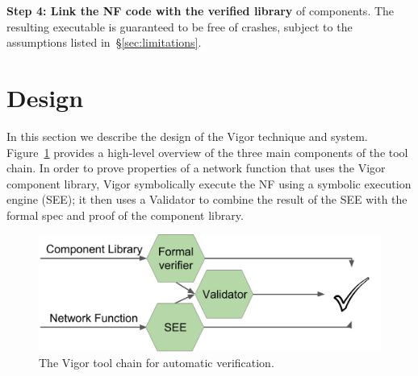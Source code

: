 \documentclass[letterpaper,twocolumn,10pt]{article}
\newcommand{\code}[1]{\lstinline{#1}}
\begin{document}
{\bf Step 4: Link the NF code with the verified library} of components. The resulting executable is guaranteed to be free of crashes, subject to the assumptions listed in~\S\ref{sec:limitations}.



\section{Design}
\label{sec:design}

In this section we describe the design of the Vigor technique and system. Figure~\ref{fig:arch} provides a high-level overview of the three main components of the tool chain. In order to prove properties of a network function that uses the Vigor component library, Vigor symbolically execute the NF using a symbolic execution engine (SEE); it then uses a Validator to combine the result of the SEE with the formal spec and proof of the component library.

\begin{figure}[h!]
    \includegraphics[width=\columnwidth]{figures/impl_overview.png}
    \caption{The Vigor tool chain for automatic verification.}
    \label{fig:arch}
\end{figure}
\end{document}
